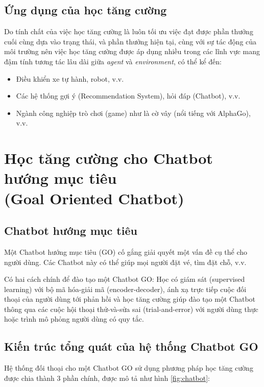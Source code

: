 \subsection{Ứng dụng của học tăng cường}
Do tính chất của việc học tăng cường là luôn tối ưu việc đạt được
phần thưởng cuối cùng dựa vào trạng thái, và phần thưởng hiện tại,
cùng với sự tác động của môi trường nên việc học tăng cường được
áp dụng nhiều trong các lĩnh vực mang đậm tính tương tác lâu dài
giữa \textit{agent} và \textit{environment}, có thể kể đến:

\begin{itemize}
    \item Điều khiển xe tự hành, robot, v.v.
    \item Các hệ thống gợi ý (Recommendation System),
    hỏi đáp (Chatbot), v.v.
    \item Ngành công nghiệp trò chơi (game) như là cờ vây
    (nổi tiếng với AlphaGo), v.v.
\end{itemize}

\section{Học tăng cường cho Chatbot hướng mục tiêu\\
(Goal Oriented Chatbot)}

\subsection{Chatbot hướng mục tiêu}
\label{subsec:chatbotgo}
Một Chatbot hướng mục tiêu (GO) \cite{traininggochatbot} cố gắng
giải quyết một vấn đề cụ thể cho người dùng. Các Chatbot này
có thể giúp mọi người đặt vé, tìm đặt chỗ, v.v.

Có hai cách chính để đào tạo một Chatbot GO: Học có giám sát
(supervised learning) với bộ mã hóa-giải mã (encoder-decoder),
ánh xạ trực tiếp cuộc đối thoại của người dùng tới phản hồi và
học tăng cường giúp đào tạo một Chatbot thông qua các cuộc
hội thoại thử-và-sửa sai (trial-and-error) với người dùng thực
hoặc trình mô phỏng người dùng có quy tắc.

\subsection{Kiến trúc tổng quát của hệ thống Chatbot GO}
Hệ thống đối thoại cho một Chatbot GO sử dụng phương pháp
học tăng cường được chia thành 3 phần chính, được mô tả như
hình \ref{fig:chatbot}:

